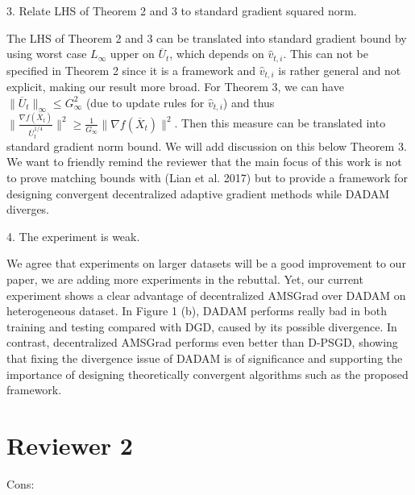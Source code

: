 \documentclass{article} %
\begin{document}
3. Relate LHS of Theorem 2 and 3 to standard gradient squared norm.

The LHS of Theorem 2 and 3 can be translated into standard gradient bound by using worst case $L_{\infty}$ upper on $\overline U_{t}$, which depends on $\hat {v}_{t,i}$. 
This can not be specified in Theorem 2 since it is a framework and $\hat {v}_{t,i}$ is rather general and not explicit, making our result more broad. 
For Theorem 3, we can have $\|\overline U_{t}\|_{\infty} \leq G_{\infty}^2$ (due to update rules for $\hat {v}_{t,i}$) and thus $\|\frac{\nabla f(\overline X_t)}{\overline U_t^{1/4}}\|^2 \geq \frac{1}{G_{\infty}}\|{\nabla f(\overline X_t)}\|^2$. 
Then this measure can be translated into standard gradient norm bound. We will add discussion on this below Theorem 3. We want to friendly remind the reviewer that the main focus of this work is not to prove matching bounds with (Lian et al. 2017) but to provide a framework for designing convergent decentralized adaptive gradient methods while DADAM diverges.


4. The experiment is weak.

We agree that experiments on larger datasets will be a good improvement to our paper, we are adding more experiments in the rebuttal. 
Yet, our current experiment shows a clear advantage of decentralized AMSGrad over DADAM on heterogeneous dataset. In Figure 1 (b), DADAM performs really bad in both training and testing compared with DGD, caused by its possible divergence. In contrast, decentralized AMSGrad performs even better than D-PSGD, showing that fixing the divergence issue of DADAM is of significance and supporting the importance of designing theoretically convergent algorithms such as the proposed framework.


\section{Reviewer 2}
\vspace{-0.1in}

Cons:
\end{document}

